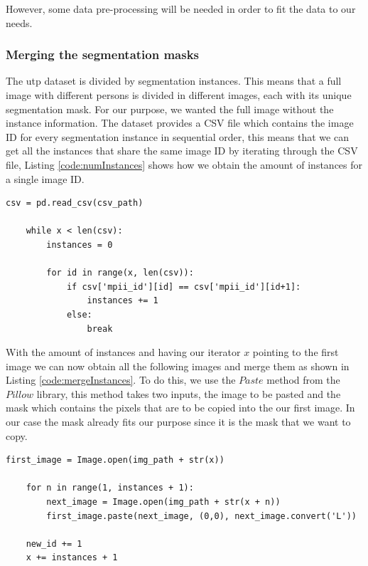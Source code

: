 However, some data pre-processing will be needed in order to fit the data to our needs. 

\subsubsection{Merging the segmentation masks}
The \gls{utp} dataset is divided by segmentation instances. This means that a full image with different persons is divided in different images, each with its unique segmentation mask. For our purpose, we wanted the full image without the instance information. The dataset provides a CSV file which contains the image ID for every segmentation instance in sequential order, this means that we can get all the instances that share the same image ID by iterating through the CSV file, Listing \ref{code:numInstances} shows how we obtain the amount of instances for a single image ID.

\begin{lstlisting}[style=Python-color, caption=Obtaining the number of instances for a single image, frame=single, label=code:numInstances]
	csv = pd.read_csv(csv_path)
	
	while x < len(csv):
		instances = 0
		
		for id in range(x, len(csv)):
			if csv['mpii_id'][id] == csv['mpii_id'][id+1]:
				instances += 1
			else:
				break
\end{lstlisting}

With the amount of instances and having our iterator $x$ pointing to the first image we can now obtain all the following images and merge them as shown in Listing \ref{code:mergeInstances}. To do this, we use the $Paste$ method from the $Pillow$ library, this method takes two inputs, the image to be pasted and the mask which contains the pixels that are to be copied into the our first image. In our case the mask already fits our purpose since it is the mask that we want to copy.

\begin{lstlisting}[style=Python-color, caption=Merging the instance masks into a single image, frame=single, label=code:mergeInstances]
	first_image = Image.open(img_path + str(x))
	
	for n in range(1, instances + 1):
		next_image = Image.open(img_path + str(x + n))
		first_image.paste(next_image, (0,0), next_image.convert('L'))
		
	new_id += 1
	x += instances + 1
\end{lstlisting}

